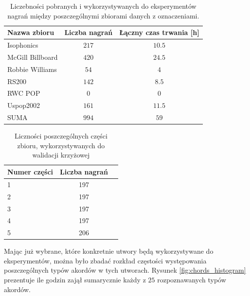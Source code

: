 \begin{table}
    \centering
    \caption{Liczebności pobranych i wykorzystywanych do eksperymentów nagrań między poszczególnymi zbiorami danych z oznaczeniami.}
    \label{tab:datasets2}
    \begin{tabular}{|l|c|c|}
        \hline
        Nazwa zbioru & Liczba nagrań & Łączny czas trwania [h] \\
        \hline
        Isophonics          & $217$ & $10.5$ \\ %
        McGill Billboard    & $420$ & $24.5$ \\ %
        Robbie Williams     & $54$  & $4$    \\ %
        RS200               & $142$ & $8.5$  \\ %
        RWC POP             & $0$   & $0$    \\
        Uspop2002           & $161$ & $11.5$ \\ %
        \hline
        SUMA                & $994$ & $59$   \\
        \hline
    \end{tabular}
\end{table}

\begin{table}
    \centering
    \caption{Liczności poszczególnych części zbioru, wykorzystywanych do walidacji krzyżowej}
    \label{tab:datasets3}
    \begin{tabular}{|l|c|c|}
        \hline
        Numer części & Liczba nagrań \\
        \hline
        1  & 197 \\
        2  & 197 \\
        3  & 197 \\
        4  & 197 \\
        5  & 206 \\
        \hline
    \end{tabular}
\end{table}

Mając już wybrane, które konkretnie utwory będą wykorzystywane do eksperymentów, można było zbadać rozkład częstości występowania poszczególnych typów akordów w tych utworach. Rysunek \ref{fig:chords_histogram} prezentuje ile godzin zajął sumarycznie każdy z $25$ rozpoznawanych typów akordów.

